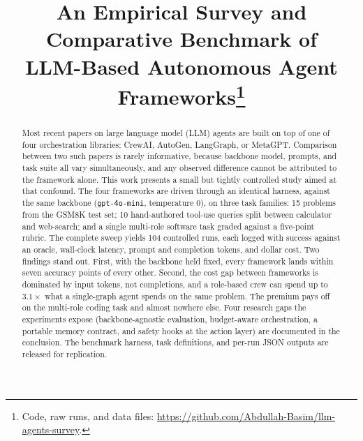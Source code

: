 \documentclass[conference]{IEEEtran}
\begin{document}
\title{An Empirical Survey and Comparative Benchmark of \\
LLM-Based Autonomous Agent Frameworks\thanks{Code, raw runs, and data files: \url{https://github.com/Abdullah-Basim/llm-agents-survey}.}}

\author{
}

\maketitle

\begin{abstract}
Most recent papers on large language model (LLM) agents are built on
top of one of four orchestration libraries: CrewAI, AutoGen, LangGraph,
or MetaGPT. Comparison between two such papers is rarely informative,
because backbone model, prompts, and task suite all vary
simultaneously, and any observed difference cannot be attributed to the
framework alone. This work presents a small but tightly controlled
study aimed at that confound. The four frameworks are driven through
an identical harness, against the same backbone (\texttt{gpt-4o-mini},
temperature 0), on three task families: 15 problems from the GSM8K
test set; 10 hand-authored tool-use queries split between calculator
and web-search; and a single multi-role software task graded against a
five-point rubric. The complete sweep yields 104 controlled runs, each
logged with success against an oracle, wall-clock latency, prompt and
completion tokens, and dollar cost. Two findings stand out. First, with the
backbone held fixed, every framework lands within seven accuracy
points of every other. Second, the cost gap between frameworks is
dominated by input tokens, not completions, and a role-based crew
can spend up to $3.1\times$ what a single-graph agent spends on the
same problem. The premium pays off on the multi-role coding task and
almost nowhere else. Four
research gaps the experiments expose (backbone-agnostic evaluation,
budget-aware orchestration, a portable memory contract, and safety
hooks at the action layer) are documented in the conclusion. The
benchmark harness, task definitions, and per-run JSON outputs are
released for replication.
\end{abstract}
\end{document}

